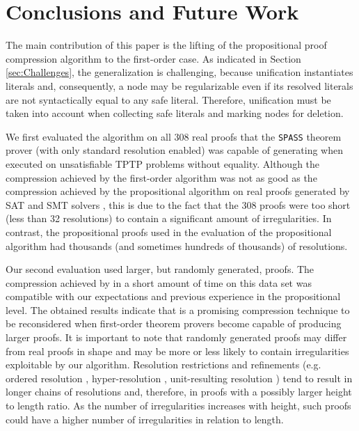 \section{Conclusions and Future Work}\label{sec:conclusion}

The main contribution of this paper is the lifting of the propositional proof compression algorithm {\RPI} to the first-order case. As indicated in Section \ref{sec:Challenges}, the generalization is challenging, because unification instantiates literals and, consequently, a node may be regularizable even if its resolved literals are not syntactically equal to any safe literal. Therefore, unification must be taken into account when collecting safe literals and marking nodes for deletion.

We first evaluated the algorithm on all 308 real proofs that the \texttt{SPASS} theorem prover (with only standard resolution enabled) was capable of generating when executed on unsatisfiable TPTP problems without equality. Although the compression achieved by the first-order {\FORPI} algorithm was not as good as the compression achieved by the propositional {\RPI} algorithm on real proofs generated by SAT and SMT solvers \cite{LURPI}, this is due to the fact that the 308 proofs were too short (less than 32 resolutions) to contain a significant amount of irregularities. In contrast, the propositional proofs used in the evaluation of the propositional {\RPI} algorithm had thousands (and sometimes hundreds of thousands) of resolutions. 

Our second evaluation used larger, but randomly generated, proofs. The compression achieved by {\FORPI} in a short amount of time on this data set was compatible with our expectations and previous experience in the propositional level. The obtained results indicate that {\FORPI} is a promising compression technique to be reconsidered when first-order theorem provers become capable of producing larger proofs. It is important to note that randomly generated proofs may differ from real proofs in shape and may be more or less likely to contain irregularities exploitable by our algorithm. Resolution restrictions and refinements (e.g. ordered resolution \cite{TODO}, hyper-resolution \cite{TODO}, unit-resulting resolution \cite{TODO}) tend to result in longer chains of resolutions and, therefore, in proofs with a possibly larger height to length ratio. As the number of irregularities increases with height, such proofs could have a higher number of irregularities in relation to length.

